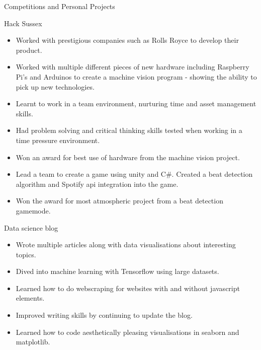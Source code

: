 \documentclass[]{article}
\newlength{\tabin}
\newlength{\secsep}
\newcommand{\lineunder}{\vspace*{-8pt} \\ \hspace*{-6pt} \hrulefill \\ \vspace*{-15pt}}
\newenvironment{tabbedsection}[1]{
  \begin{list}{}{
      \setlength{\itemsep}{0pt}
      \setlength{\labelsep}{0pt}
      \setlength{\labelwidth}{0pt}
      \setlength{\leftmargin}{\tabin}
      \setlength{\rightmargin}{\tabin}
      \setlength{\listparindent}{0pt}
      \setlength{\parsep}{0pt}
      \setlength{\parskip}{0pt}
      \setlength{\partopsep}{0pt}
      \setlength{\topsep}{#1}
    }
  \item[]
}{\end{list}}
\newenvironment{resume_section}[1]{
  \filbreak
  \vspace{2\secsep}
  \textsc{\large#1}
  \lineunder
  \begin{tabbedsection}{\secsep}
}{\end{tabbedsection}}
\newenvironment{resume_subsection}[2][]{
  \textbf{#2} \hfill {\footnotesize #1} \hspace{2em}
  \begin{tabbedsection}{0.5\secsep}
}{\end{tabbedsection}}
\newenvironment{subitems}{
  \renewcommand{\labelitemi}{-}
  \begin{itemize}
      \setlength{\labelsep}{1em}
}{\end{itemize}}
\begin{document}
\begin{resume_section}{Competitions and Personal Projects}
  \begin{resume_subsection}[(November 2018 \& 2019)]{Hack Sussex}
    \begin{subitems}
    \item Worked with prestigious companies such as Rolls Royce to develop their product.
    \item Worked with multiple different pieces of new hardware including Raspberry Pi's and Arduinos to create a machine vision program - showing the ability to pick up new technologies.
    \item Learnt to work in a team environment, nurturing time and asset management skills.
    \item Had problem solving and critical thinking skills tested when working in a time pressure environment.
    \item Won an award for best use of hardware from the machine vision project.
    \item Lead a team to create a game using unity and C\#. Created a beat detection algorithm and Spotify api integration into the game. 
    \item Won the award for most atmospheric project from a beat detection gamemode. 
    \end{subitems}
  \end{resume_subsection}

    \begin{resume_subsection}{Data science blog}
    \begin{subitems}
        \item Wrote multiple articles along with data visualisations about interesting topics.
        \item Dived into machine learning with Tensorflow using large datasets.
        \item Learned how to do webscraping for websites with and without javascript elements.
        \item Improved writing skills by continuing to update the blog.
        \item Learned how to code aesthetically pleasing visualisations in seaborn and matplotlib.
    \end{subitems}
  \end{resume_subsection}
\end{resume_section}
\end{document}
